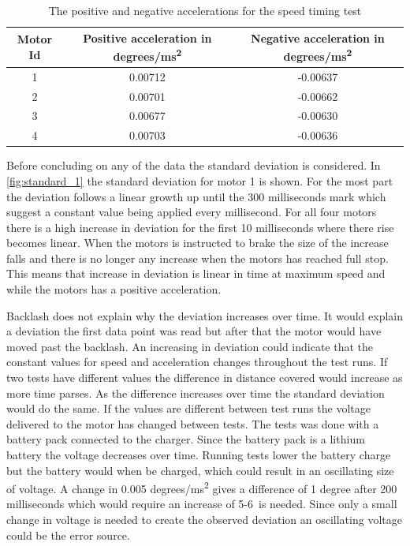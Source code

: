 \begin{table}
  \centering
  \begin{tabular}{| c | c | c |}
    \hline
    Motor Id & Positive acceleration in degrees/ms\textsuperscript{2}& Negative acceleration in degrees/ms\textsuperscript{2}  \\ \hline
    1 & 0.00712 & -0.00637 \\ \hline
    2 & 0.00701 & -0.00662  \\ \hline
    3 & 0.00677 & -0.00630 \\ \hline
    4 & 0.00703 & -0.00636   \\ \hline
  \end{tabular}
  \caption{The positive and negative accelerations for the speed timing test}
  \label{tbl:acc}
\end{table}

Before concluding on any of the data the standard deviation is considered. In \cref{fig:standard_1} the standard deviation for motor 1 is shown. For the most part the deviation follows a linear growth up until the 300 milliseconds mark which suggest a constant value being applied every millisecond. For all four motors there is a high increase in deviation for the first 10 milliseconds where there rise becomes linear. When the motors is instructed to brake the size of the increase falls and there is no longer any increase when the motors has reached full stop. This means that increase in deviation is linear in time at maximum speed and while the motors has a positive acceleration.

Backlash does not explain why the deviation increases over time. It would explain a deviation the first data point was read but after that the motor would have moved past the backlash. An increasing in deviation could indicate that the constant values for speed and acceleration changes throughout the test runs. If two tests have different values the difference in distance covered would increase as more time parses. As the difference increases over time the standard deviation would do the same. If the values are different between test runs the voltage delivered to the motor has changed between tests. The tests was done with a battery pack connected to the charger. Since the battery pack is a lithium battery the voltage decreases over time. Running tests lower the battery charge but the battery would when be charged, which could result in an oscillating size of voltage. A change in 0.005 degrees/ms\textsuperscript{2} gives a difference of 1 degree after 200 milliseconds which would require an increase of 5-6\textperthousand\ is needed. Since only a small change in voltage is needed to create the observed deviation an oscillating voltage could be the error source.


